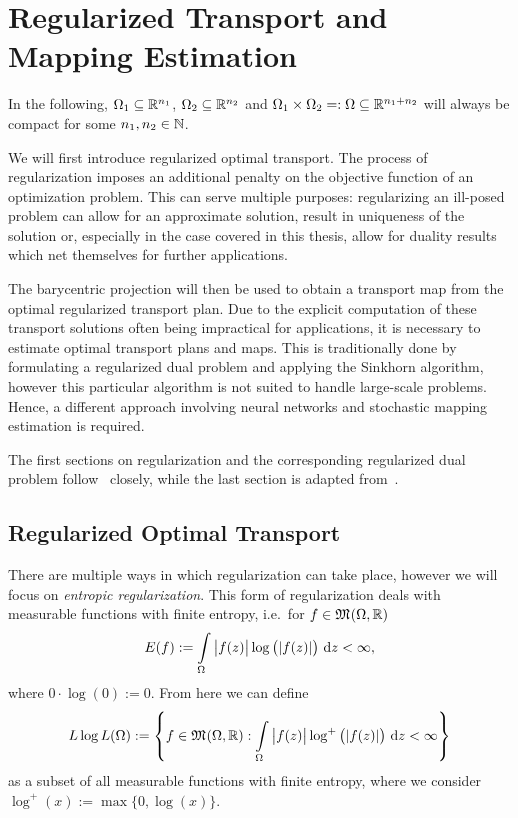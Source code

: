\chapter[Regularized Transport and Mapping Estimation]{\texorpdfstring{Regularized Transport and \\ Mapping Estimation}{Regularized Transport and Mapping Estimation}}\label{DualPlanEst}

In the following, $\Omega_1 \subseteq \R^{n_1}$, $\Omega_2 \subseteq \R^{n_2}$ and $\Omega_1 \times \Omega_2 =: \Omega \subseteq \R^{n_1 + n_2}$ will always be compact for some $\NinN[n_1, n_2]$.

We will first introduce regularized optimal transport. The process of regularization imposes an additional penalty on the objective function of an optimization problem. This can serve multiple purposes: regularizing an ill-posed problem can allow for an approximate solution, result in uniqueness of the solution or, especially in the case covered in this thesis, allow for duality results which net themselves for further applications.

The barycentric projection will then be used to obtain a transport map from the optimal regularized transport plan. Due to the explicit computation of these transport solutions often being impractical for applications, it is necessary to estimate optimal transport plans and maps. This is traditionally done by formulating a regularized dual problem and applying the Sinkhorn algorithm, however this particular algorithm is not suited to handle large-scale problems. Hence, a different approach involving neural networks and stochastic mapping estimation is required.

The first sections on regularization and the corresponding regularized dual problem follow\ \cite{Cla2021} closely, while the last section is adapted from\ \cite[Section~3 and Section~4]{Seg2018}.

\section{Regularized Optimal Transport}\label{RegOT}

There are multiple ways in which regularization can take place, however we will focus on \textit{entropic regularization}. This form of regularization deals with measurable functions with finite entropy, i.e.~for $f \in \MF{\Omega}{\R}$
\[ E(f) := \int\limits_\Omega \big\vert f(z) \big\vert \log\big( \vert f(z) \vert \big)~\D[z] < \infty, \]
where $0 \cdot \log(0) := 0$. From here we can define
\[ \LLL := \left\{ f \in \MF{\Omega}{\R} : \int\limits_\Omega \big\vert f(z) \big\vert \log^+\big( \vert f(z) \vert \big)~\D[z] < \infty \right\} \]
as a subset of all measurable functions with finite entropy, where we consider $\log^+(x) := \max \{ 0, \log (x) \}$.

